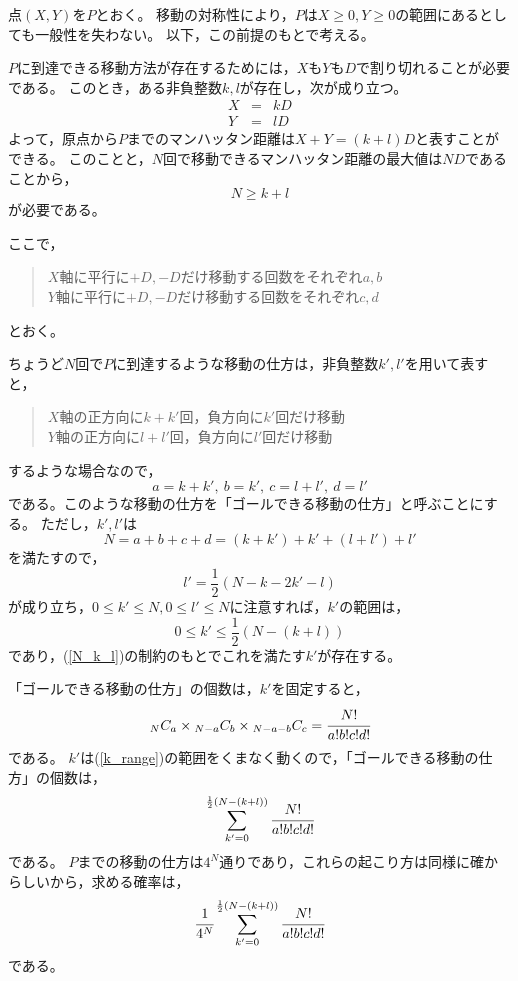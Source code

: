\documentclass{article}
\begin{document}
点$(X, Y)$を$P$とおく。
移動の対称性により，$P$は$X \geq 0, Y \geq 0$の範囲にあるとしても一般性を失わない。
以下，この前提のもとで考える。

$P$に到達できる移動方法が存在するためには，$X$も$Y$も$D$で割り切れることが必要である。
このとき，ある非負整数$k, l$が存在し，次が成り立つ。
\begin{eqnarray*}
    X &=& kD \\
    Y &=& lD
\end{eqnarray*}
よって，原点から$P$までのマンハッタン距離は$X + Y = (k + l)D$と表すことができる。
このことと，$N$回で移動できるマンハッタン距離の最大値は$ND$であることから，
\begin{equation}
    \label{N_k_l}
    N \geq k + l
\end{equation}
が必要である。

ここで，
\begin{quote}
    $X$軸に平行に$+D, -D$だけ移動する回数をそれぞれ$a, b$ \\
    $Y$軸に平行に$+D, -D$だけ移動する回数をそれぞれ$c, d$
\end{quote}
とおく。

ちょうど$N$回で$P$に到達するような移動の仕方は，非負整数$k', l'$を用いて表すと，
\begin{quote}
    $X$軸の正方向に$k + k'$回，負方向に$k'$回だけ移動 \\
    $Y$軸の正方向に$l + l'$回，負方向に$l'$回だけ移動
\end{quote}
するような場合なので，
$$a = k + k',\ b = k',\ c = l + l',\ d = l'$$
である。このような移動の仕方を「ゴールできる移動の仕方」と呼ぶことにする。
ただし，$k', l'$は
$$N = a + b + c + d = (k + k') + k' + (l + l') + l'$$
を満たすので，
$$l' = \frac{1}{2} (N - k - 2k' - l)$$
が成り立ち，$0 \leq k' \leq N, 0 \leq l' \leq N$に注意すれば，$k'$の範囲は，
\begin{equation}
    \label{k_range}
    0 \leq k' \leq \frac{1}{2} (N - (k + l))
\end{equation}
であり，(\ref{N_k_l})の制約のもとでこれを満たす$k'$が存在する。

「ゴールできる移動の仕方」の個数は，$k'$を固定すると，
\[
    {}_N C_a \times {}_{N-a} C_b \times {}_{N-a-b} C_c = \cfrac{N!}{a!b!c!d!}
\]
である。
$k'$は(\ref{k_range})の範囲をくまなく動くので，「ゴールできる移動の仕方」の個数は，
\[
    \sum_{k' = 0}^{ \frac{1}{2} (N - (k + l)) } \cfrac{N!}{a!b!c!d!}
\]
である。
$P$までの移動の仕方は$4^N$通りであり，これらの起こり方は同様に確からしいから，求める確率は，
\[
    \cfrac{1}{4^N} \sum_{k' = 0}^{ \frac{1}{2} (N - (k + l)) } \cfrac{N!}{a!b!c!d!}
\]
である。
\end{document}
